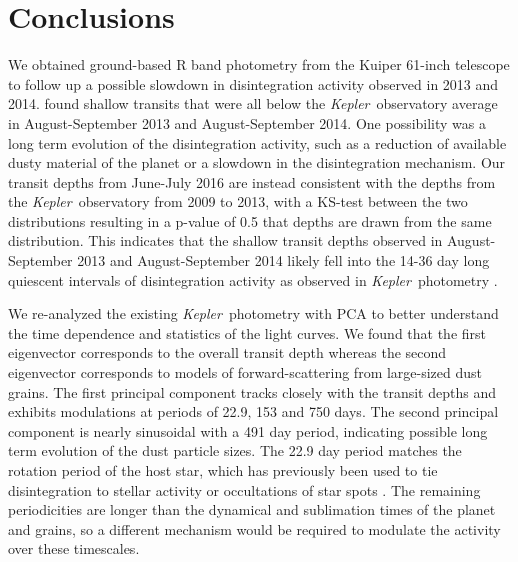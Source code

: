 \documentclass[preprint,trackchanges]{aastex61}
\newcommand{\kepler}{{\it Kepler}}
\begin{document}
\section{Conclusions}\label{sec:conclusions}

We obtained ground-based R band photometry from the Kuiper 61-inch telescope to follow up a possible slowdown in disintegration activity observed in 2013 and 2014.
\citet{schlawin2016kic1255} found shallow transits that were all below the \kepler\ observatory average in August-September 2013 and August-September 2014.
One possibility was a long term evolution of the disintegration activity, such as a reduction of available dusty material of the planet or a slowdown in the disintegration mechanism.
Our transit depths from June-July 2016 are instead consistent with the depths from the \kepler\ observatory from 2009 to 2013, with a KS-test between the two distributions resulting in a p-value of 0.5 that depths are drawn from the same distribution.
This indicates that the shallow transit depths observed in August-September 2013 and August-September 2014 likely fell into the 14-36 day long quiescent intervals of disintegration activity as observed in \kepler\ photometry \citep{kawahara2013starspots,vanWerkhoven2014,croll2015starspots}.

We re-analyzed the existing \kepler\ photometry with PCA to better understand the time dependence and statistics of the light curves.
We found that the first eigenvector corresponds to the overall transit depth whereas the second eigenvector corresponds to models of forward-scattering from  large-sized dust grains.
The first principal component tracks closely with the transit depths and exhibits modulations at periods of 22.9, 153 and 750 days.
The second principal component is nearly sinusoidal with a 491 day period, indicating possible long term evolution of the dust particle sizes.
The 22.9 day period matches the rotation period of the host star, which has previously been used to tie disintegration to stellar activity \citep{kawahara2013starspots} or occultations of star spots \citep{croll2015starspots}.
The remaining periodicities are longer than the dynamical and sublimation times of the planet and grains, so a different mechanism would be required to modulate the activity over these timescales.
\end{document}
